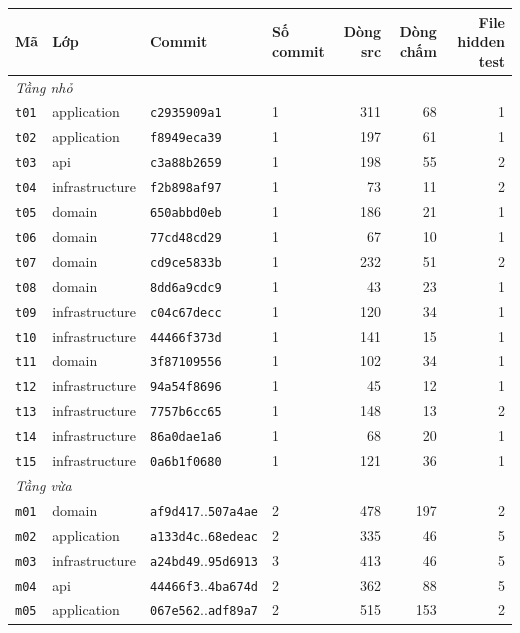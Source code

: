 \begin{tabular}{llllrrr}
\toprule
Mã & Lớp & Commit & Số commit & Dòng src & Dòng chấm & File hidden test \\
\midrule
\multicolumn{7}{l}{\textit{Tầng nhỏ}} \\
\texttt{t01} & application & \texttt{c2935909a1} & 1 & 311 & 68 & 1 \\
\texttt{t02} & application & \texttt{f8949eca39} & 1 & 197 & 61 & 1 \\
\texttt{t03} & api & \texttt{c3a88b2659} & 1 & 198 & 55 & 2 \\
\texttt{t04} & infrastructure & \texttt{f2b898af97} & 1 & 73 & 11 & 2 \\
\texttt{t05} & domain & \texttt{650abbd0eb} & 1 & 186 & 21 & 1 \\
\texttt{t06} & domain & \texttt{77cd48cd29} & 1 & 67 & 10 & 1 \\
\texttt{t07} & domain & \texttt{cd9ce5833b} & 1 & 232 & 51 & 2 \\
\texttt{t08} & domain & \texttt{8dd6a9cdc9} & 1 & 43 & 23 & 1 \\
\texttt{t09} & infrastructure & \texttt{c04c67decc} & 1 & 120 & 34 & 1 \\
\texttt{t10} & infrastructure & \texttt{44466f373d} & 1 & 141 & 15 & 1 \\
\texttt{t11} & domain & \texttt{3f87109556} & 1 & 102 & 34 & 1 \\
\texttt{t12} & infrastructure & \texttt{94a54f8696} & 1 & 45 & 12 & 1 \\
\texttt{t13} & infrastructure & \texttt{7757b6cc65} & 1 & 148 & 13 & 2 \\
\texttt{t14} & infrastructure & \texttt{86a0dae1a6} & 1 & 68 & 20 & 1 \\
\texttt{t15} & infrastructure & \texttt{0a6b1f0680} & 1 & 121 & 36 & 1 \\
\midrule\multicolumn{7}{l}{\textit{Tầng vừa}} \\
\texttt{m01} & domain & \texttt{af9d417}..\texttt{507a4ae} & 2 & 478 & 197 & 2 \\
\texttt{m02} & application & \texttt{a133d4c}..\texttt{68edeac} & 2 & 335 & 46 & 5 \\
\texttt{m03} & infrastructure & \texttt{a24bd49}..\texttt{95d6913} & 3 & 413 & 46 & 5 \\
\texttt{m04} & api & \texttt{44466f3}..\texttt{4ba674d} & 2 & 362 & 88 & 5 \\
\texttt{m05} & application & \texttt{067e562}..\texttt{adf89a7} & 2 & 515 & 153 & 2 \\

\end{tabular}
